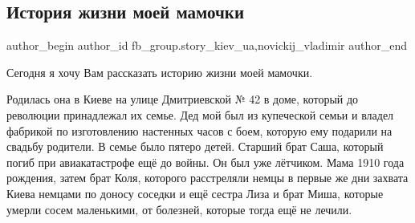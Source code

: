  
 
 
 
 
 
\subsection{История жизни моей мамочки}
\label{sec:18_01_2022.fb.fb_group.story_kiev_ua.1.mamochka}
 
\ifcmt
 author_begin
   author_id fb_group.story_kiev_ua,novickij_vladimir
 author_end
\fi

Сегодня я хочу Вам рассказать историю жизни моей мамочки.     

Родилась она в Киеве на улице Дмитриевской № 42 в доме, который до революции
принадлежал их семье. Дед мой был из купеческой семьи и владел фабрикой по
изготовлению настенных часов с боем, которую ему подарили на свадьбу родители.
В семье было пятеро детей. Старший брат Саша, который погиб при авиакатастрофе
ещё до войны. Он был уже лётчиком.  Мама 1910 года рождения, затем брат Коля,
которого расстреляли немцы в первые же дни захвата Киева немцами по доносу
соседки и ещё сестра Лиза и брат Миша, которые умерли сосем маленькими, от
болезней, которые тогда ещё не лечили. 

